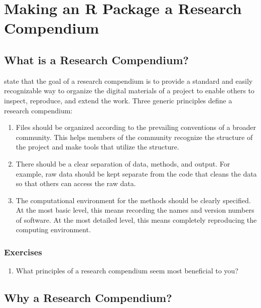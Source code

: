 \documentclass[
]{book}
\providecommand{\tightlist}{%
  \setlength{\itemsep}{0pt}\setlength{\parskip}{0pt}}
\begin{document}
\hypertarget{r-package-rc}{%
\chapter{Making an R Package a Research Compendium}\label{r-package-rc}}

\hypertarget{what-is-a-rc}{%
\section{What is a Research Compendium?}\label{what-is-a-rc}}

\citet{marwick2018packaging} state that the goal of a research compendium is to provide a standard and easily recognizable way to organize the digital materials of a project to enable others to inspect, reproduce, and extend the work. Three generic principles define a research compendium:

\begin{enumerate}
\def\labelenumi{\arabic{enumi}.}
\item
  Files should be organized according to the prevailing conventions of a broader community. This helps members of the community recognize the structure of the project and make tools that utilize the structure.
\item
  There should be a clear separation of data, methods, and output. For example, raw data should be kept separate from the code that cleans the data so that others can access the raw data.
\item
  The computational environment for the methods should be clearly specified. At the most basic level, this means recording the names and version numbers of software. At the most detailed level, this means completely reproducing the computing environment.
\end{enumerate}

\hypertarget{ex-set7}{%
\subsection{Exercises}\label{ex-set7}}

\begin{enumerate}
\def\labelenumi{\arabic{enumi}.}
\tightlist
\item
  What principles of a research compendium seem most beneficial to you?
\end{enumerate}

\hypertarget{why-a-rc}{%
\section{Why a Research Compendium?}\label{why-a-rc}}
\end{document}
